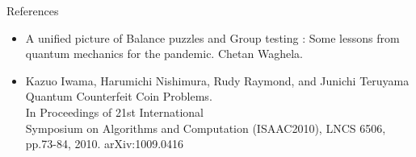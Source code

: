 \documentclass{beamer} %
\begin{document}
	\begin{frame}
		\begin{block}{References}
			\begin{itemize}
				\item A unified picture of Balance puzzles and Group testing : Some lessons from quantum mechanics for the pandemic. Chetan Waghela. 
				\item Kazuo Iwama, Harumichi Nishimura, Rudy Raymond, and Junichi Teruyama\\
				Quantum Counterfeit Coin Problems.\\
				In Proceedings of 21st International\\ Symposium on Algorithms and Computation (ISAAC2010), LNCS 6506, pp.73-84, 2010.
				arXiv:1009.0416
				
			\end{itemize}
		\end{block}
	\end{frame}
\end{document}
